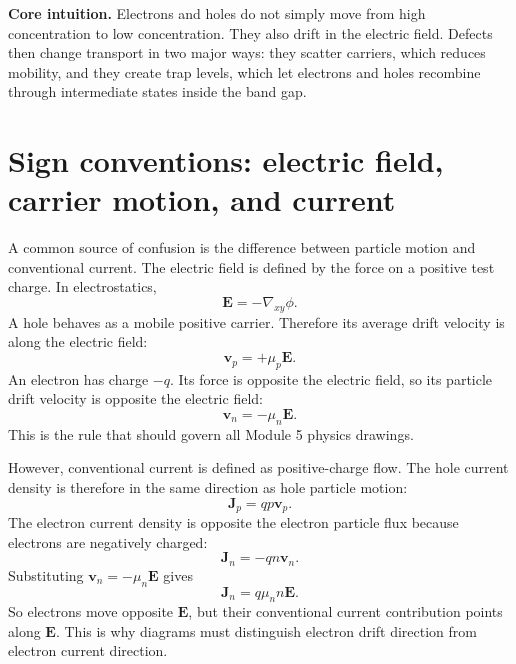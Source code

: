 \documentclass[11pt]{article}
\newcommand{\Evec}{\bm{E}}
\newcommand{\Jvec}{\bm{J}}
\newcommand{\vvec}{\bm{v}}
\newcommand{\gradxy}{\nabla_{xy}}
\begin{document}
\begin{physicsbox}
\textbf{Core intuition.} Electrons and holes do not simply move from high concentration to low concentration. They also drift in the electric field. Defects then change transport in two major ways: they scatter carriers, which reduces mobility, and they create trap levels, which let electrons and holes recombine through intermediate states inside the band gap.
\end{physicsbox}

\section{Sign conventions: electric field, carrier motion, and current}

A common source of confusion is the difference between particle motion and conventional current. The electric field is defined by the force on a positive test charge. In electrostatics,
\begin{equation}
\Evec=-\gradxy \phi.
\end{equation}
A hole behaves as a mobile positive carrier. Therefore its average drift velocity is along the electric field:
\begin{equation}
\vvec_p=+\mu_p \Evec.
\end{equation}
An electron has charge \(-q\). Its force is opposite the electric field, so its particle drift velocity is opposite the electric field:
\begin{equation}
\vvec_n=-\mu_n \Evec.
\end{equation}
This is the rule that should govern all Module 5 physics drawings.

However, conventional current is defined as positive-charge flow. The hole current density is therefore in the same direction as hole particle motion:
\begin{equation}
\Jvec_p=q p\vvec_p.
\end{equation}
The electron current density is opposite the electron particle flux because electrons are negatively charged:
\begin{equation}
\Jvec_n=-q n\vvec_n.
\end{equation}
Substituting \(\vvec_n=-\mu_n\Evec\) gives
\begin{equation}
\Jvec_n=q\mu_n n\Evec.
\end{equation}
So electrons move opposite \(\Evec\), but their conventional current contribution points along \(\Evec\). This is why diagrams must distinguish electron drift direction from electron current direction.
\end{document}
